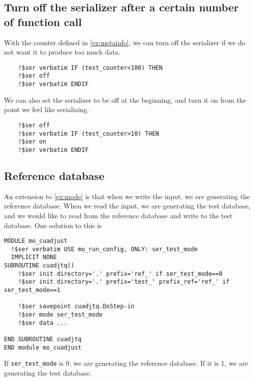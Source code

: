 \documentclass{article}
\begin{document}
\subsection{Turn off the serializer after a certain number of function call}
With the counter defined in \ref{ex:metainfo}, we can turn off the serializer if we do not want it to produce too much data.
\begin{lstlisting}
    !$ser verbatim IF (test_counter<100) THEN
    !$ser off
    !$ser verbatim ENDIF
\end{lstlisting}

We can also set the serializer to be off at the beginning, and turn it on from the point we feel like serializing.
\begin{lstlisting}
    !$ser off
    !$ser verbatim IF (test_counter>10) THEN
    !$ser on
    !$ser verbatim ENDIF
\end{lstlisting}

\subsection{Reference database}
An extension to \ref{ex:mode} is that when we write the input, we are generating the reference database. When we read the input, we are generating the test database, and we would like to read from the reference database and write to the test database. One solution to this is
\begin{lstlisting}
MODULE mo_cuadjust
  !$ser verbatim USE mo_run_config, ONLY: ser_test_mode
  IMPLICIT NONE
SUBROUTINE cuadjtq()
    !$ser init directory='.' prefix='ref_' if ser_test_mode==0
    !$ser init directory='.' prefix='test_' prefix_ref='ref_' if ser_test_mode==1

    !$ser savepoint cuadjtq.DoStep-in
    !$ser mode ser_test_mode
    !$ser data ...

END SUBROUTINE cuadjtq
END module mo_cuadjust
\end{lstlisting}

If \texttt{ser\_test\_mode} is 0, we are generating the reference database. If it is 1, we are generating the test database.
\end{document}
